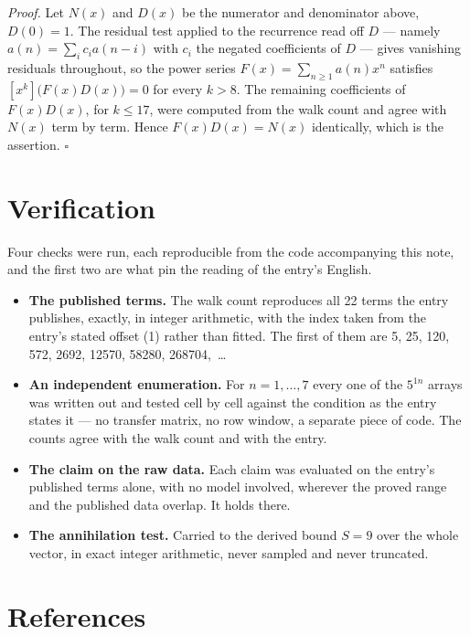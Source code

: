 \documentclass[11pt]{article}
\theoremstyle{definition}
\begin{document}
{\itshape Proof.} Let $N(x)$ and $D(x)$ be the numerator and denominator above, $D(0)=1$. The residual test applied to the recurrence read off $D$ --- namely $a(n) = \sum_i c_i a(n-i)$ with $c_i$ the negated coefficients of $D$ --- gives vanishing residuals throughout, so the power series $F(x)=\sum_{n\ge 1}a(n)x^n$ satisfies $[x^k]\bigl(F(x)D(x)\bigr) = 0$ for every $k > 8$. The remaining coefficients of $F(x)D(x)$, for $k \le 17$, were computed from the walk count and agree with $N(x)$ term by term. Hence $F(x)D(x) = N(x)$ identically, which is the assertion. $\square$

\section{Verification}

Four checks were run, each reproducible from the code accompanying this note, and the first two are what pin the reading of the entry's English.

\begin{itemize}

\item {\bfseries The published terms.} The walk count reproduces all 22 terms the entry publishes, exactly, in integer arithmetic, with the index taken from the entry's stated offset (1) rather than fitted. The first of them are 5, 25, 120, 572, 2692, 12570, 58280, 268704,~\dots

\item {\bfseries An independent enumeration.} For $n = 1,\dots,7$ every one of the $5^{1n}$ arrays was written out and tested cell by cell against the condition as the entry states it --- no transfer matrix, no row window, a separate piece of code. The counts agree with the walk count and with the entry.

\item {\bfseries The claim on the raw data.} Each claim was evaluated on the entry's published terms alone, with no model involved, wherever the proved range and the published data overlap. It holds there.

\item {\bfseries The annihilation test.} Carried to the derived bound $S = 9$ over the whole vector, in exact integer arithmetic, never sampled and never truncated.

\end{itemize}

\section{References}
\end{document}
